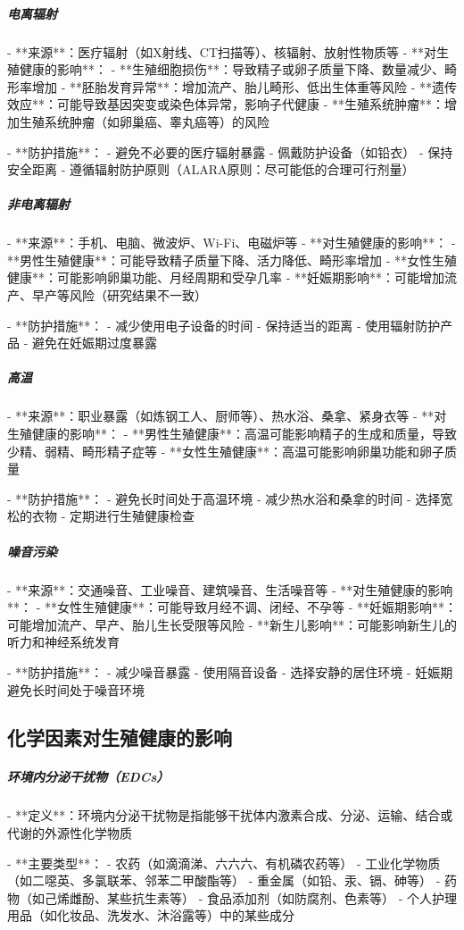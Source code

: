\begin{enumerate}
\subparagraph{电离辐射}

- **来源**：医疗辐射（如X射线、CT扫描等）、核辐射、放射性物质等
- **对生殖健康的影响**：
  - **生殖细胞损伤**：导致精子或卵子质量下降、数量减少、畸形率增加
  - **胚胎发育异常**：增加流产、胎儿畸形、低出生体重等风险
  - **遗传效应**：可能导致基因突变或染色体异常，影响子代健康
  - **生殖系统肿瘤**：增加生殖系统肿瘤（如卵巢癌、睾丸癌等）的风险

- **防护措施**：
  - 避免不必要的医疗辐射暴露
  - 佩戴防护设备（如铅衣）
  - 保持安全距离
  - 遵循辐射防护原则（ALARA原则：尽可能低的合理可行剂量）

\subparagraph{非电离辐射}

- **来源**：手机、电脑、微波炉、Wi-Fi、电磁炉等
- **对生殖健康的影响**：
  - **男性生殖健康**：可能导致精子质量下降、活力降低、畸形率增加
  - **女性生殖健康**：可能影响卵巢功能、月经周期和受孕几率
  - **妊娠期影响**：可能增加流产、早产等风险（研究结果不一致）

- **防护措施**：
  - 减少使用电子设备的时间
  - 保持适当的距离
  - 使用辐射防护产品
  - 避免在妊娠期过度暴露

\subparagraph{高温}

- **来源**：职业暴露（如炼钢工人、厨师等）、热水浴、桑拿、紧身衣等
- **对生殖健康的影响**：
  - **男性生殖健康**：高温可能影响精子的生成和质量，导致少精、弱精、畸形精子症等
  - **女性生殖健康**：高温可能影响卵巢功能和卵子质量

- **防护措施**：
  - 避免长时间处于高温环境
  - 减少热水浴和桑拿的时间
  - 选择宽松的衣物
  - 定期进行生殖健康检查

\subparagraph{噪音污染}

- **来源**：交通噪音、工业噪音、建筑噪音、生活噪音等
- **对生殖健康的影响**：
  - **女性生殖健康**：可能导致月经不调、闭经、不孕等
  - **妊娠期影响**：可能增加流产、早产、胎儿生长受限等风险
  - **新生儿影响**：可能影响新生儿的听力和神经系统发育

- **防护措施**：
  - 减少噪音暴露
  - 使用隔音设备
  - 选择安静的居住环境
  - 妊娠期避免长时间处于噪音环境

\subsection{化学因素对生殖健康的影响}

\subparagraph{环境内分泌干扰物（EDCs）}

- **定义**：环境内分泌干扰物是指能够干扰体内激素合成、分泌、运输、结合或代谢的外源性化学物质

- **主要类型**：
  - 农药（如滴滴涕、六六六、有机磷农药等）
  - 工业化学物质（如二噁英、多氯联苯、邻苯二甲酸酯等）
  - 重金属（如铅、汞、镉、砷等）
  - 药物（如己烯雌酚、某些抗生素等）
  - 食品添加剂（如防腐剂、色素等）
  - 个人护理用品（如化妆品、洗发水、沐浴露等）中的某些成分


\end{enumerate}
